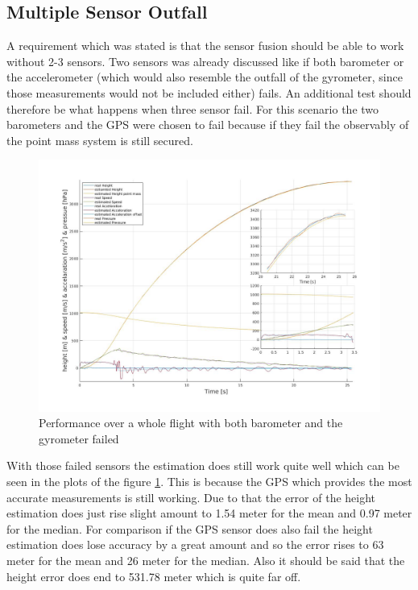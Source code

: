 \newpage
\subsection{Multiple Sensor Outfall}
A requirement which was stated is that the sensor fusion should be able to work without 2-3 sensors.
Two sensors was already discussed like if both barometer or the accelerometer
(which would also resemble the outfall of the gyrometer, since those measurements would not be included either) fails.
An additional test should therefore be what happens when three sensor fail.
For this scenario the two barometers and the GPS were chosen to fail because if they fail the observably of the point mass system is still secured.

\begin{figure}[h!]
 \centering
 \includegraphics[width=.8\textwidth]{./Pictures/BestSystemPerformanceAccOutfall.jpg}
 \caption{Performance over a whole flight with both barometer and the gyrometer failed}
 \label{fig:PerformanceMOutfall}
\end{figure}

With those failed sensors the estimation does still work quite well which can be seen in the plots of the figure \ref{fig:PerformanceMOutfall}.
This is because the GPS which provides the most accurate measurements is still working.
Due to that the error of the height estimation does just rise slight amount to 1.54 meter for the mean and 0.97 meter for the median.
For comparison if the GPS sensor does also fail the height estimation does lose accuracy by a great amount and so the error rises to 63 meter for the mean and 26 meter for the median.
Also it should be said that the height error does end to 531.78 meter which is quite far off.
